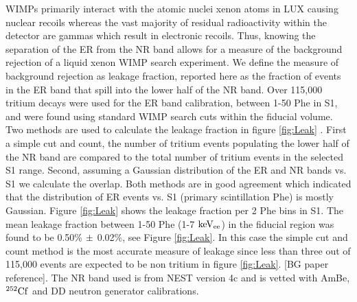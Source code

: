WIMPs primarily interact with the atomic nuclei xenon atoms in LUX causing nuclear recoils whereas the vast majority of residual radioactivity within the detector are gammas which result in electronic recoils. Thus, knowing the separation of the ER from the NR band allows for a measure of the background rejection of a liquid xenon WIMP search experiment. We define the measure of background rejection as leakage fraction, reported here as the fraction of events in the ER band that spill into the lower half of the NR band. Over 115,000 tritium decays were used for the ER band calibration, between 1-50 Phe in S1, and were found using standard WIMP search cuts within the fiducial volume. Two methods are used to calculate the leakage fraction in figure \ref{fig:Leak} . First a simple cut and count,  the number of tritium events populating the lower half of the NR band are compared to the total number of tritium events in the selected S1 range. Second, assuming a Gaussian distribution of the ER and NR bands vs. S1 we calculate the overlap. 
Both methods are in good agreement which indicated that the distribution of ER events vs. S1 (primary scintillation Phe) is mostly Gaussian. Figure \ref{fig:Leak} shows the leakage fraction per 2 Phe bins in S1. The mean leakage fraction between 1-50 Phe (1-7 $\rm keV_{ee}$) in the fiducial region was found to be 0.50\% $\rm \pm$ 0.02\%, see Figure \ref{fig:Leak}. In this case the simple cut and count method is the most accurate measure of leakage since less than three out of 115,000 events are expected to be non tritium in figure \ref{fig:Leak}. [BG paper reference]. The NR band used is from NEST version 4c and is vetted with AmBe, $\rm^{252}Cf$ and DD neutron generator calibrations.


